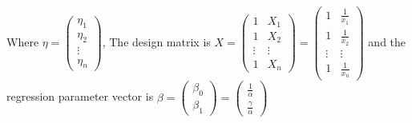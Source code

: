 \documentclass[11pt,a4paper]{article}
\begin{document}
Where $\eta=\begin{pmatrix}
	\eta_{1}	\\
	\eta_{2}	\\
	\vdots\\
	\eta_{n}	
\end{pmatrix}$, The design matrix is $X=\begin{pmatrix}{}
1	& X_{1} \\
1	& X_{2} \\
\vdots	&\vdots  \\
1	& X_{n}
\end{pmatrix}=\begin{pmatrix}{}
1	&  \frac{1}{x_{1}} \\
1	&  \frac{1}{x_{2}} \\
\vdots	&\vdots  \\
1	&  \frac{1}{x_{n}} 
\end{pmatrix}$ and the regression parameter vector is $\beta=\begin{pmatrix}
\beta_{0}\\
\beta_{1} 
\end{pmatrix}=\begin{pmatrix}
 \frac{1}{\alpha}\\
 \frac{\gamma}{\alpha}
\end{pmatrix}$
\end{document}
